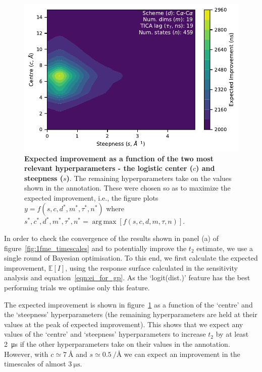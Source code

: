 \documentclass[journal=jacsat,manuscript=article]{achemso}
\DeclareMathOperator*{\argmax}{arg\,max}
\begin{document}
\begin{figure}
    \centering
    \includegraphics{figures/surface_distances_logistic_ei.pdf}
    \caption{\textbf{Expected improvement as a function of the two most relevant hyperparameters - the logistic center ($c$) and steepness ($s$)}. The remaining hyperparameters take on the values shown in the annotation. These were chosen so as to maximize the expected improvement, i.e., the figure plots $y=f(s, c, d^{*}, m^{*}, \tau^{*}, n^{*})$ where $s^{*}, c^{*}, d^{*}, m^{*}, \tau^{*}, n^{*} = \argmax \left [f(s, c, d, m, \tau,n)\right]$. }
    \label{fig:ei_surface}
\end{figure}

In order to check the convergence of the results shown in panel (a) of figure~\ref{fig:1fme_timescales} and to potentially improve the $t_2$ estimate,  we use a single round of Bayesian optimisation. To this end, we first calculate the expected improvement, $\mathbb{E}[I]$,  using the response surface calculated in the sensitivity analysis and  equation~\ref{eqn:ei_for_gp}. As the `logit(dist.)' feature has the best performing trials we optimise only this feature. 


The expected improvement is shown in figure~\ref{fig:ei_surface} as a function of the `centre' and the `steepness' hyperparameters (the remaining hyperparameters are held at their values at the peak of expected improvement).  This shows that we expect any values of the `centre' and `steepness' hyperparameters to increase $t_2$ by at least \SI{2}{\micro\second} if the other hyperparameters take on their values in the annotation. However, with $c\simeq \SI{7}{\angstrom}$ and $s\simeq \SI{0.5}{\per\angstrom}$ we can expect an improvement in the timescales of almost $\SI{3}{\micro\second}$. 
\end{document}
